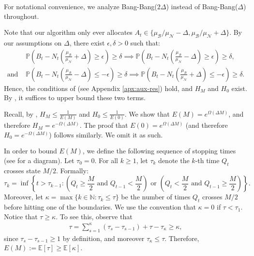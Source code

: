 \documentclass[mnsc,nonblindrev]{informs3}
\newcommand{\E}{\mathbb{E}}
\newcommand{\pr}{\mathbb{P}}
\renewcommand{\Pr}{\pr}
\newcommand{\NDist}{\mathcal{N}}
\newcommand{\BDist}{\mathcal{B}}
\newcommand{\Nmean}{\mu_{\NDist}}
\newcommand{\Bmean}{\mu_{\BDist}}
\newcommand{\ALG}{{Bang-Bang}\xspace}
\renewenvironment{proof}[1][Proof]{%
  \par\noindent{\itshape #1.} \ignorespaces
}{%
  \hfill\Halmos\par
}
\begin{document}
\begin{proof}[Proof]
For notational convenience, we analyze \ALG($2\Delta$) instead of \ALG($\Delta$) throughout. 

Note that our algorithm only ever allocates $A_t \in \{\Bmean / \Nmean - \Delta, \Bmean / \Nmean + \Delta\}$. By our assumptions on $\Delta$, there exist $\epsilon, \delta > 0$ such that:
\begin{align*}
&\Pr\left(B_t-N_t\left(\frac{\mu_{\BDist}}{\mu_{\NDist}} + \Delta \right) \geq \epsilon \right) \geq \delta \implies \Pr\left(B_t-N_t\left(\frac{\mu_{\BDist}}{\mu_{\NDist}} - \Delta \right) \geq \epsilon \right) \geq \delta,\\
\text{and } &\Pr\left(B_t-N_t\left(\frac{\mu_{\BDist}}{\mu_{\NDist}} - \Delta \right) \leq -\epsilon \right) \geq \delta \implies \Pr\left(B_t-N_t\left(\frac{\mu_{\BDist}}{\mu_{\NDist}} + \Delta \right) \leq -\epsilon \right) \geq \delta.
\end{align*}
Hence, the conditions of  (see Appendix \ref{apx:aux-res}) hold, and $H_M$ and $H_0$ exist. By , it suffices to upper bound these two terms. 

Recall, by , $H_M \leq \frac{1}{E(M)}$ and $H_0 \leq \frac{1}{E(0)}$. We show that
$E(M) = e^{\Omega(\Delta M)}$, and therefore \mbox{$H_M = e^{-\Omega(\Delta M)}$}. The proof that $E(0) = e^{\Omega(\Delta M)}$ (and therefore $H_0 = e^{-{\Omega}(\Delta M)}$) follows similarly. We omit it as such.

In order to bound $E(M)$, we define the following sequence of stopping times {(see  for a diagram)}. Let $\tau_0 = 0$. For all $k \geq 1$, let $\tau_k$ denote the $k$-th time $Q_t$ crosses state $M/2$. Formally:
\[\tau_{k} = \inf\left\{t > \tau_{k-1}: \left(Q_t \geq \frac{M}{2} \text{ and } Q_{t-1} < \frac{M}{2}\right) \text{ or } \left(Q_t<\frac{M}{2} \text{ and } Q_{t-1} \geq \frac{M}{2}\right)\right\}.\]
Moreover, let $\kappa = \max\{k \in \mathbb{N}: \tau_k \leq \tau\}$ be the number of times $Q_t$ crosses $M/2$ before hitting one of the boundaries. We use the convention that $\kappa = 0$ if $\tau < \tau_1$. Notice that $\tau \geq \kappa$. To see this, observe that
\begin{align*}
\tau = \sum_{s=1}^{\kappa}\left(\tau_s-\tau_{s-1}\right) + \tau-\tau_{\kappa} \geq \kappa,
\end{align*}
since $\tau_s - \tau_{s-1} \geq 1$ by definition, and moreover $\tau_\kappa \leq \tau$. Therefore, $E(M) := \E[\tau] \geq \E[\kappa]$.


\end{proof}
\end{document}
